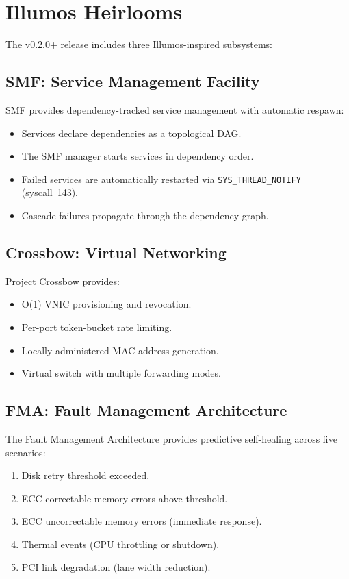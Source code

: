 \documentclass[11pt,a4paper,twoside]{report}
\theoremstyle{definition}
\newcommand{\syscall}[1]{\texttt{#1}}
\begin{document}
\section{Illumos Heirlooms}

The v0.2.0+ release includes three Illumos-inspired subsystems:

\subsection{SMF: Service Management Facility}

SMF provides dependency-tracked service management with automatic respawn:

\begin{itemize}[leftmargin=1.4em]
  \item Services declare dependencies as a topological DAG.
  \item The SMF manager starts services in dependency order.
  \item Failed services are automatically restarted via
    \syscall{SYS\_THREAD\_NOTIFY} (syscall~143).
  \item Cascade failures propagate through the dependency graph.
\end{itemize}

\subsection{Crossbow: Virtual Networking}

Project Crossbow provides:
\begin{itemize}[leftmargin=1.4em]
  \item O(1) VNIC provisioning and revocation.
  \item Per-port token-bucket rate limiting.
  \item Locally-administered MAC address generation.
  \item Virtual switch with multiple forwarding modes.
\end{itemize}

\subsection{FMA: Fault Management Architecture}

The Fault Management Architecture provides predictive self-healing across
five scenarios:

\begin{enumerate}[leftmargin=1.4em]
  \item Disk retry threshold exceeded.
  \item ECC correctable memory errors above threshold.
  \item ECC uncorrectable memory errors (immediate response).
  \item Thermal events (CPU throttling or shutdown).
  \item PCI link degradation (lane width reduction).
\end{enumerate}
\end{document}
